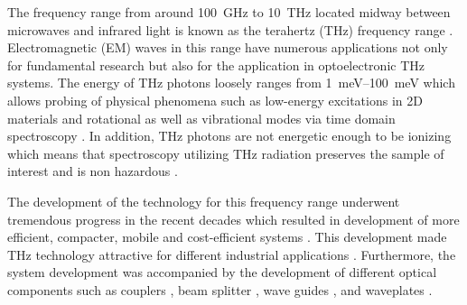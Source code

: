 The frequency range from around \SI{100}{\giga \hertz} to \SI{10}{\tera \hertz} located midway between microwaves and infrared light is known as the terahertz (THz) frequency range \cite{Jepsen2011}. Electromagnetic (EM) waves in this range have numerous applications not only for fundamental research but also for the application in optoelectronic THz systems. The energy of THz photons loosely ranges from \SIrange[range-units=single]{1}{100}{\milli \electronvolt} which allows probing of physical phenomena such as low-energy excitations in 2D materials \cite{Winnerl2018} and rotational as well as vibrational modes via time domain spectroscopy \cite{Walther2002, Giesen2005, Baxter2011, Mittleman2003}. In addition, THz photons are not energetic enough to be ionizing which means that spectroscopy utilizing THz radiation preserves the sample of interest and is non hazardous \cite{Jepsen2011}.

The development of the technology for this frequency range underwent tremendous progress in the recent decades which resulted in development of more efficient, compacter, mobile and cost-efficient systems \cite{Wilk08, Jordens2008, Wilk11, Dietz11, Probst14, Probst15, Abdulmunem17, Kohlhaas17, Merghem2017}. This development made THz technology attractive for different industrial applications \cite{Naftaly2019}. Furthermore, the system development was accompanied by the development of different optical components such as couplers \cite{Huang2019, Nielsen10, Wu2016, Ying17}, beam splitter \cite{Ung12, Lenets21}, wave guides \cite{Ma2016, Gui2015}, and waveplates \cite{Nouman2016, Scherger2011, Wang2015}.


